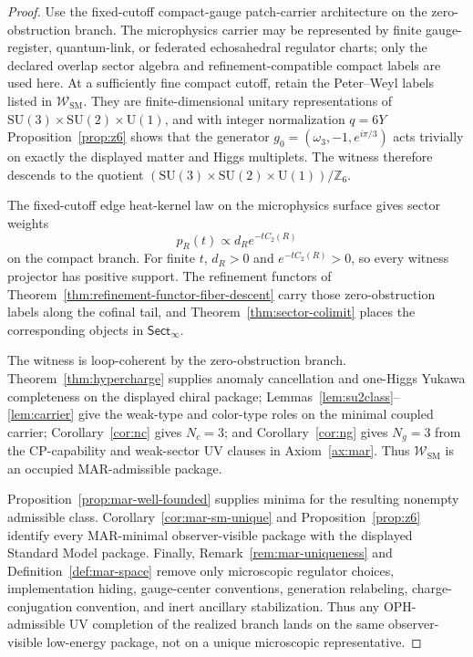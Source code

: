 \documentclass[11pt]{article}
\newcommand{\SU}{\mathrm{SU}}
\newcommand{\U}{\mathrm{U}}
\begin{document}
\begin{proof}
Use the fixed-cutoff compact-gauge patch-carrier architecture on the zero-obstruction branch. The
microphysics carrier may be represented by finite gauge-register, quantum-link, or federated
echosahedral regulator charts; only the declared overlap sector algebra and refinement-compatible
compact labels are used here. At a sufficiently fine compact cutoff, retain the Peter--Weyl labels
listed in \(\mathcal W_{\mathrm{SM}}\). They are finite-dimensional unitary representations of
\(\SU(3)\times\SU(2)\times\U(1)\), and with integer normalization \(q=6Y\)
Proposition~\ref{prop:z6} shows that the generator \(g_0=(\omega_3,-1,e^{i\pi/3})\) acts trivially
on exactly the displayed matter and Higgs multiplets. The witness therefore descends to the
quotient \((\SU(3)\times\SU(2)\times\U(1))/\mathbb Z_6\).

The fixed-cutoff edge heat-kernel law on the microphysics surface gives sector weights
\[
p_R(t)\propto d_R e^{-tC_2(R)}
\]
on the compact branch. For finite \(t\), \(d_R>0\) and \(e^{-tC_2(R)}>0\), so every witness projector has positive support. The refinement functors of Theorem~\ref{thm:refinement-functor-fiber-descent} carry those zero-obstruction labels along the cofinal tail, and Theorem~\ref{thm:sector-colimit} places the corresponding objects in \(\mathsf{Sect}_\infty\).

The witness is loop-coherent by the zero-obstruction branch. Theorem~\ref{thm:hypercharge} supplies anomaly cancellation and one-Higgs Yukawa completeness on the displayed chiral package; Lemmas~\ref{lem:su2class}--\ref{lem:carrier} give the weak-type and color-type roles on the minimal coupled carrier; Corollary~\ref{cor:nc} gives \(N_c=3\); and Corollary~\ref{cor:ng} gives \(N_g=3\) from the CP-capability and weak-sector UV clauses in Axiom~\ref{ax:mar}. Thus \(\mathcal W_{\mathrm{SM}}\) is an occupied MAR-admissible package.

Proposition~\ref{prop:mar-well-founded} supplies minima for the resulting nonempty admissible class. Corollary~\ref{cor:mar-sm-unique} and Proposition~\ref{prop:z6} identify every MAR-minimal observer-visible package with the displayed Standard Model package. Finally, Remark~\ref{rem:mar-uniqueness} and Definition~\ref{def:mar-space} remove only microscopic regulator choices, implementation hiding, gauge-center conventions, generation relabeling, charge-conjugation convention, and inert ancillary stabilization. Thus any OPH-admissible UV completion of the realized branch lands on the same observer-visible low-energy package, not on a unique microscopic representative.
\end{proof}
\end{document}
